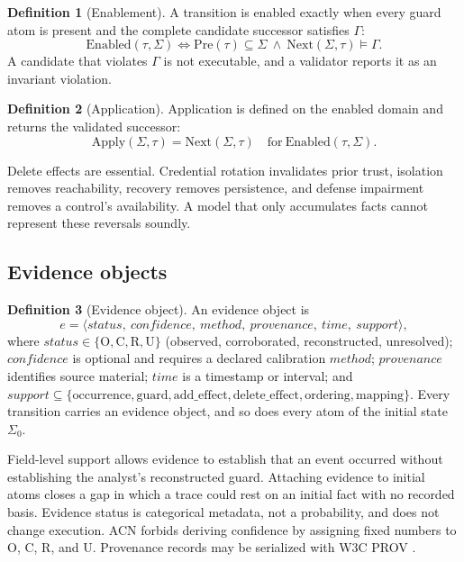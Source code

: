 \documentclass[11pt,letterpaper]{article}
\theoremstyle{definition}
\newtheorem{definition}{Definition}
\newcommand{\St}{\Sigma}
\newcommand{\Inv}{\Gamma}
\newcommand{\Pre}{\mathrm{Pre}}
\newcommand{\Next}{\mathrm{Next}}
\newcommand{\En}{\mathrm{Enabled}}
\newcommand{\Ap}{\mathrm{Apply}}
\begin{document}
\begin{definition}[Enablement]
A transition is enabled exactly when every guard atom is present and the complete candidate successor satisfies $\Inv$:
\begin{equation}\label{eq:enabled}
\En(\tau,\St)\iff \Pre(\tau)\subseteq\St\ \wedge\ \Next(\St,\tau)\models\Inv .
\end{equation}
A candidate that violates $\Inv$ is not executable, and a validator reports it as an invariant violation.
\end{definition}

\begin{definition}[Application]
Application is defined on the enabled domain and returns the validated successor:
\begin{equation}\label{eq:apply}
\Ap(\St,\tau)=\Next(\St,\tau)\quad\text{for}\ \En(\tau,\St).
\end{equation}
\end{definition}
Delete effects are essential. Credential rotation invalidates prior trust, isolation removes reachability, recovery removes persistence, and defense impairment removes a control's availability. A model that only accumulates facts cannot represent these reversals soundly.

\subsection{Evidence objects}\label{sec:evobj}

\begin{definition}[Evidence object]
An evidence object is
\[e=\langle \mathit{status},\ \mathit{confidence},\ \mathit{method},\ \mathit{provenance},\ \mathit{time},\ \mathit{support}\rangle,\]
where $\mathit{status}\in\{\mathrm{O},\mathrm{C},\mathrm{R},\mathrm{U}\}$ (observed, corroborated, reconstructed, unresolved); $\mathit{confidence}$ is optional and requires a declared calibration $\mathit{method}$; $\mathit{provenance}$ identifies source material; $\mathit{time}$ is a timestamp or interval; and $\mathit{support}\subseteq\{\text{occurrence},\text{guard},\text{add\_effect},\text{delete\_effect},\text{ordering},\text{mapping}\}$. Every transition carries an evidence object, and so does every atom of the initial state $\St_0$.
\end{definition}
Field-level support allows evidence to establish that an event occurred without establishing the analyst's reconstructed guard. Attaching evidence to initial atoms closes a gap in which a trace could rest on an initial fact with no recorded basis. Evidence status is categorical metadata, not a probability, and does not change execution. ACN forbids deriving confidence by assigning fixed numbers to O, C, R, and U. Provenance records may be serialized with W3C PROV \cite{prov}.
\end{document}
